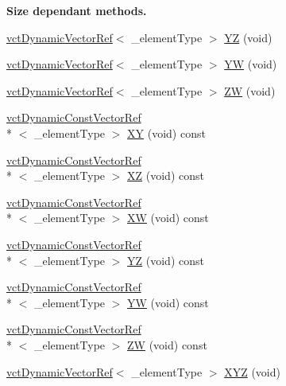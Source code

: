 \begin{Indent}{\bf Size dependant methods.}
\begin{DoxyCompactItemize}
\hyperlink{classvct_dynamic_vector_ref}{vct\-Dynamic\-Vector\-Ref}$<$ \-\_\-element\-Type $>$ \hyperlink{classvct_dynamic_vector_base_a42ae7ee6df6d93a1248338490e5d2440}{Y\-Z} (void)
\item 
\hyperlink{classvct_dynamic_vector_ref}{vct\-Dynamic\-Vector\-Ref}$<$ \-\_\-element\-Type $>$ \hyperlink{classvct_dynamic_vector_base_a354e6752fbb9ae3d559f868a47df9ae1}{Y\-W} (void)
\item 
\hyperlink{classvct_dynamic_vector_ref}{vct\-Dynamic\-Vector\-Ref}$<$ \-\_\-element\-Type $>$ \hyperlink{classvct_dynamic_vector_base_a79547eec078c029c39968a24be5ff789}{Z\-W} (void)
\item 
\hyperlink{classvct_dynamic_const_vector_ref}{vct\-Dynamic\-Const\-Vector\-Ref}\\*
$<$ \-\_\-element\-Type $>$ \hyperlink{classvct_dynamic_vector_base_afe423ba4dc5c4a4c1862cecd40d976ea}{X\-Y} (void) const 
\item 
\hyperlink{classvct_dynamic_const_vector_ref}{vct\-Dynamic\-Const\-Vector\-Ref}\\*
$<$ \-\_\-element\-Type $>$ \hyperlink{classvct_dynamic_vector_base_aa9c7bbdbec9e45e55d9e2a40851a69a6}{X\-Z} (void) const 
\item 
\hyperlink{classvct_dynamic_const_vector_ref}{vct\-Dynamic\-Const\-Vector\-Ref}\\*
$<$ \-\_\-element\-Type $>$ \hyperlink{classvct_dynamic_vector_base_a519032c001cf5abef98eec4a8d507547}{X\-W} (void) const 
\item 
\hyperlink{classvct_dynamic_const_vector_ref}{vct\-Dynamic\-Const\-Vector\-Ref}\\*
$<$ \-\_\-element\-Type $>$ \hyperlink{classvct_dynamic_vector_base_adb644a21e8df88cbcc256131f7381481}{Y\-Z} (void) const 
\item 
\hyperlink{classvct_dynamic_const_vector_ref}{vct\-Dynamic\-Const\-Vector\-Ref}\\*
$<$ \-\_\-element\-Type $>$ \hyperlink{classvct_dynamic_vector_base_a0831c0124fb285f0f357bd234e1012c4}{Y\-W} (void) const 
\item 
\hyperlink{classvct_dynamic_const_vector_ref}{vct\-Dynamic\-Const\-Vector\-Ref}\\*
$<$ \-\_\-element\-Type $>$ \hyperlink{classvct_dynamic_vector_base_a6c17bdbbc81a83c91e482e1449eb351b}{Z\-W} (void) const 
\item 
\hyperlink{classvct_dynamic_vector_ref}{vct\-Dynamic\-Vector\-Ref}$<$ \-\_\-element\-Type $>$ \hyperlink{classvct_dynamic_vector_base_a41e0d558b7e790345d4e5638292dbc31}{X\-Y\-Z} (void)

\end{DoxyCompactItemize}
\end{Indent}
